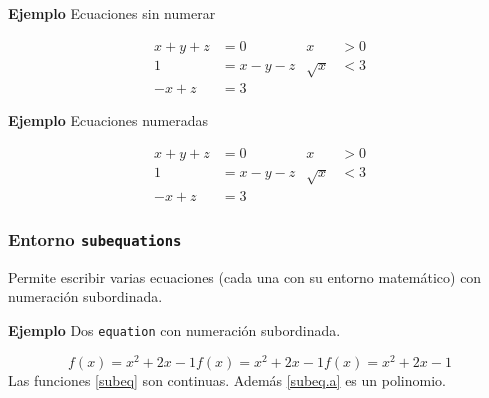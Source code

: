 \documentclass[11pt,a4paper]{report}
\begin{document}
\bigskip
\textbf{Ejemplo} Ecuaciones sin numerar

\begin{align*}
x+y+z & =0     &       x  & > 0\\
1     & =x-y-z & \sqrt{x} & < 3  \\
-x+z  & =3
\end{align*}

\bigskip





\bigskip
\textbf{Ejemplo} Ecuaciones numeradas

\begin{align}
x+y+z & =0     &       x  & > 0\\
1     & =x-y-z & \sqrt{x} & < 3 \nonumber \\
-x+z  & =3
\end{align}

\bigskip






\subsubsection{Entorno \texttt{subequations}}





Permite escribir varias ecuaciones (cada una con su entorno matemático) con numeración subordinada.





\bigskip
\textbf{Ejemplo} Dos \texttt{equation} con numeración subordinada.

\begin{subequations}\label{subeq}
\begin{equation}\label{subeq.a}
f(x)=x^2+2x-1
\end{equation}
\begin{equation}\label{subeq.b}
f(x)=x^2+2x-1
\end{equation}
\begin{equation}\label{subeq.c}
f(x)=x^2+2x-1
\end{equation}
\end{subequations}
Las funciones \eqref{subeq} son continuas. Además \eqref{subeq.a} es un polinomio.
\end{document}
